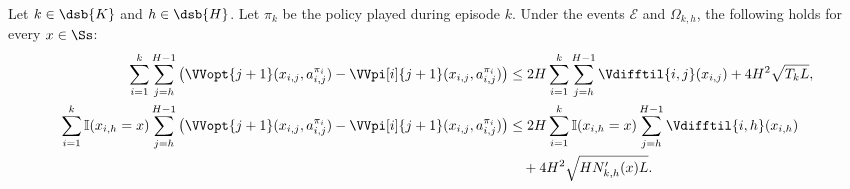 \begin{lemma}
\label{lem:sum_var_diff_opt}
    Let $k \in \dsb{K}$ and $h \in \dsb{H}$. Let $\pi_k$ be the policy played during episode $k$. Under the events $\mathcal{E}$ and $\Omega_{k,h}$, the following holds for every $x \in \Ss$:
    \begin{align*}
        \sum_{i=1}^k \sum_{j=h}^{H-1} \left( \VVopt{j+1} (x_{i,j}, a_{i,j}^{\pi_i}) - \VVpi[i]{j+1} (x_{i,j}, a_{i,j}^{\pi_i}) \right) &\le 2 H \sum_{i=1}^k \sum_{j=h}^{H-1} \Vdifftil{i,j}(x_{i,j}) + 4 H^2 \sqrt{T_k L}, \\
        \sum_{i=1}^k \mathbb{I}(x_{i,h}=x) \sum_{j=h}^{H-1} \left( \VVopt{j+1} (x_{i,j}, a_{i,j}^{\pi_i}) - \VVpi[i]{j+1} (x_{i,j}, a_{i,j}^{\pi_i}) \right) &\le 2 H \sum_{i=1}^k \mathbb{I}(x_{i,h}=x) \sum_{j=h}^{H-1} \Vdifftil{i,h}(x_{i,h}) \\
        &\quad + 4H^2 \sqrt{H N'_{k,h}(x) L}.
    \end{align*}
\end{lemma}

